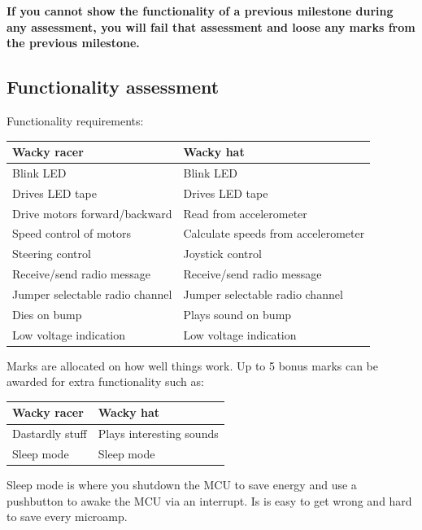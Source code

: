 \documentclass[11pt, a4paper]{article}
\begin{document}
\textbf{If you cannot show the functionality of a previous milestone
  during any assessment, you will fail that assessment and loose any
  marks from the previous milestone.}


\subsection{Functionality assessment}

Functionality requirements:
%
\begin{flushleft}
  \begin{tabular}{l|l}
    Wacky racer & Wacky hat \\ \hline \hline
    Blink LED                      & Blink LED \\
    Drives LED tape                & Drives LED tape \\
    Drive motors forward/backward  & Read from accelerometer \\
    Speed control of motors        & Calculate speeds from accelerometer \\
    Steering control               & Joystick control \\
    Receive/send radio message     & Receive/send radio message \\
    Jumper selectable radio channel & Jumper selectable radio channel  \\
    Dies on bump                   & Plays sound on bump \\
    Low voltage indication         & Low voltage indication \\
  \end{tabular}
\end{flushleft}
%
Marks are allocated on how well things work.  Up to 5 bonus marks can
be awarded for extra functionality such as:
%
\begin{flushleft}
  \begin{tabular}{l|l}
    Wacky racer                & Wacky hat \\ \hline \hline
    Dastardly stuff            & Plays interesting sounds \\
    Sleep mode                 & Sleep mode \\
  \end{tabular}
\end{flushleft}

Sleep mode is where you shutdown the MCU to save energy and use a
pushbutton to awake the MCU via an interrupt.  Is is easy to get wrong
and hard to save every microamp.
\end{document}
